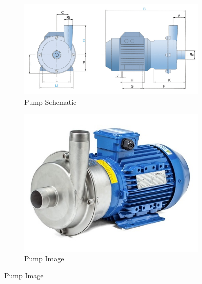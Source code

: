 \begin{figure}[H]
    \centering
    \begin{subfigure}{0.49\linewidth}
        \includegraphics[width=\linewidth]{chapters/Z-support/figures/pump_schematic.PNG}
        \caption{Pump Schematic \cite{tapflo_cti_nodate}}
    \end{subfigure}
    \begin{subfigure}{0.49\linewidth}
        \includegraphics[width=\linewidth]{chapters/Z-support/figures/pump_image.jpg}
        \caption{Pump Image \cite{tapflo_cti_nodate}}
    \end{subfigure}
\end{figure}

